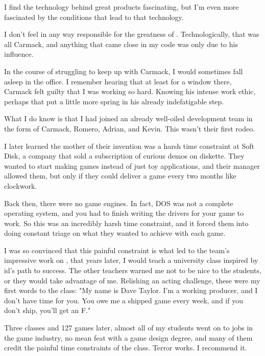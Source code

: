 I find the technology behind great products fascinating, but I'm even more fascinated by the conditions that lead to that technology.\\
\par
I don't feel in any way responsible for the greatness of \doom{}.  Technologically, that was all Carmack, and anything that came close in my code was only due to his influence.\\
\par
In the course of struggling to keep up with Carmack, I would sometimes fall asleep in the office.  I remember hearing that at least for a window there, Carmack felt guilty that I was working so hard.  Knowing his intense work ethic, perhaps that put a little more spring in his already indefatigable step.\\
\par
What I do know is that I had joined an already well-oiled development team in the form of Carmack, Romero, Adrian, and Kevin.  This wasn't their first rodeo.\\
\par
I later learned the mother of their invention was a harsh time constraint at Soft Disk, a company that sold a subscription of curious demos on diskette.  They wanted to start making games instead of just toy applications, and their manager allowed them, but only if they could deliver a game every two months like clockwork.\\
\par
Back then, there were no game engines.  In fact, DOS was not a complete operating system, and you had to finish writing the drivers for your game to work.  So this was an incredibly harsh time constraint, and it forced them into doing constant triage on what they wanted to achieve with each game.\\
\par
I was so convinced that this painful constraint is what led to the team's impressive work on \doom{}, that years later, I would teach a university class inspired by id's path to success.  The other teachers warned me not to be nice to the students, or they would take advantage of me.  Relishing an acting challenge, these were my first words to the class: "My name is Dave Taylor.  I'm a working producer, and I don't have time for you.  You owe me a shipped game every week, and if you don't ship, you'll get an F."\\
\par
Three classes and 127 games later, almost all of my students went on to jobs in the game industry, no mean feat with a game design degree, and many of them credit the painful time constraints of the class.  Terror works.  I recommend it.\\
